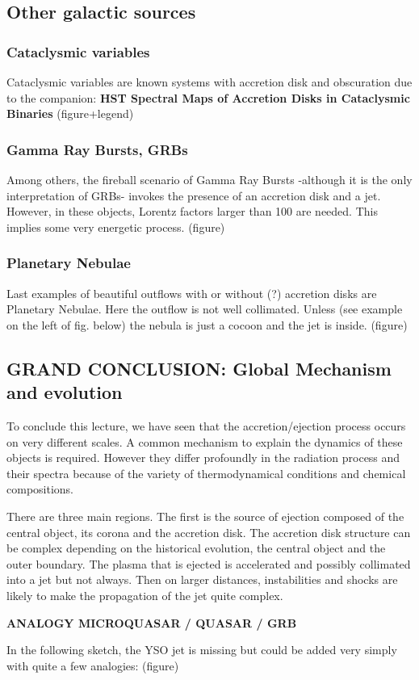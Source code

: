 \documentclass[10pt,a4paper,english]{article}
\begin{document}
\subsection{Other galactic sources}
\subsubsection{Cataclysmic variables}
Cataclysmic variables are known systems with accretion disk and obscuration due to the companion: \textbf{HST Spectral Maps of Accretion Disks in Cataclysmic Binaries} (figure+legend)

\subsubsection{Gamma Ray Bursts, GRBs}
Among others, the fireball scenario of Gamma Ray Bursts -although it is the only interpretation of GRBs- invokes the presence of an accretion disk and a jet. However, in these objects, Lorentz factors larger than 100 are needed. This implies some very energetic process. (figure)

\subsubsection{Planetary Nebulae}
Last examples of beautiful outflows with or without (?) accretion disks are Planetary Nebulae. Here the outflow is not well collimated. Unless (see example on the left of fig. below) the nebula is just a cocoon and the jet is inside. (figure)

\subsection{GRAND CONCLUSION: Global Mechanism and evolution}

To conclude this lecture, we have seen that the accretion/ejection process occurs on very different scales. A common mechanism to explain the dynamics of these objects is required. However they differ profoundly in the radiation process and their spectra because of the variety of thermodynamical conditions and chemical compositions.

There are three main regions. The first is the source of ejection composed of the central object, its corona and the accretion disk. The accretion disk structure can be complex depending on the historical evolution, the central object and the outer boundary. The plasma that is ejected is accelerated and possibly collimated into a jet but not always. Then on larger distances, instabilities and shocks are likely to make the propagation of the jet quite complex.

\textbf{ANALOGY MICROQUASAR / QUASAR / GRB}

In the following sketch, the YSO jet is missing but could be added very simply with quite a few analogies: (figure)

\appendix

\makeatletter
\def\@seccntformat#1{Appendix~\csname the#1\endcsname:\quad}
\makeatother

\newpage




\listoffixmes
\end{document}
